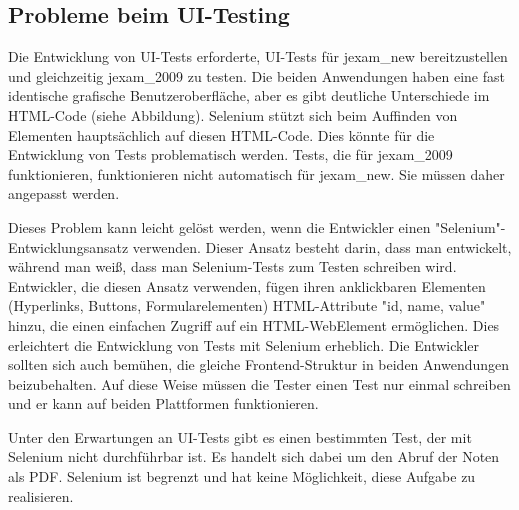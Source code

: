 \subsection{Probleme beim UI-Testing}


Die Entwicklung von UI-Tests erforderte, UI-Tests für \Gls{jexam_new}
bereitzustellen und gleichzeitig \Gls{jexam_2009} zu testen. Die beiden
Anwendungen haben eine fast identische grafische Benutzeroberfläche,
aber es gibt deutliche Unterschiede im HTML-Code (siehe Abbildung).
Selenium stützt sich beim Auffinden von Elementen hauptsächlich auf
diesen HTML-Code. Dies könnte für die Entwicklung von Tests
problematisch werden. Tests, die für \Gls{jexam_2009} funktionieren,
funktionieren  nicht automatisch  für \Gls{jexam_new}. Sie müssen daher
angepasst werden.


Dieses Problem kann leicht gelöst werden, wenn die Entwickler
einen "Selenium"-Entwicklungsansatz verwenden. Dieser Ansatz
besteht darin, dass man entwickelt, während man weiß, dass man
Selenium-Tests zum Testen schreiben wird. Entwickler, die diesen
Ansatz verwenden, fügen ihren anklickbaren Elementen (Hyperlinks,
Buttons, Formularelementen) HTML-Attribute "id, name, value" hinzu,
die einen einfachen Zugriff auf ein HTML-WebElement ermöglichen.
Dies erleichtert die Entwicklung von Tests mit Selenium erheblich.
Die Entwickler sollten sich auch bemühen, die gleiche
Frontend-Struktur in beiden Anwendungen beizubehalten. Auf diese
Weise müssen die Tester einen Test nur einmal schreiben und er
kann auf beiden Plattformen funktionieren.

Unter den Erwartungen an UI-Tests gibt es einen bestimmten Test,
der mit Selenium nicht durchführbar ist. Es handelt sich dabei um
den Abruf der Noten als PDF. Selenium ist begrenzt und hat keine
Möglichkeit, diese Aufgabe zu realisieren.

